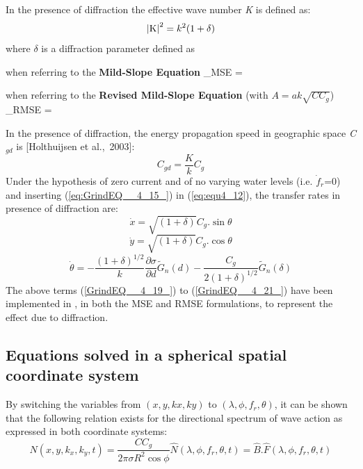  In the presence of diffraction the effective wave number \textit{K} is defined as:
\begin{equation} \label{eq:GrindEQ__4_15_}
\left|{\rm K} \right|^{2} =k^{2} (1+\delta )
\end{equation}
where $\delta$ is a diffraction parameter defined as

when referring to the \textbf{Mild-Slope Equation} \cite{Berkhoff1972}
\bequ
\label{eq:GrindEQ__4_16_}
 \delta _{MSE} = 
\eequ       
     
when referring to the \textbf{Revised Mild-Slope Equation} \cite{Porter2003} (with $A=ak\sqrt{CC_{g}}$)
\bequ
\label{eq:GrindEQ__4_17_}
\delta _{RMSE} = 
\eequ

 In the presence of diffraction, the energy propagation speed in geographic space \textit{C${}_{gd}$} is [Holthuijsen et al.,~2003]:
\begin{equation} \label{GrindEQ__4_18_}
C_{gd} =\frac{K}{k} C_{g}
\end{equation}
Under the hypothesis of zero current and of no varying water levels (i.e. $\dot{f}_{r} $=0) and inserting (\ref{eq:GrindEQ__4_15_}) in (\ref{eq:equ4_12}), the transfer rates in presence of diffraction are:
\begin{equation} \label{GrindEQ__4_19_}
\dot{x}=\sqrt{(1+\delta )} C_{g} .\sin \theta
\end{equation}
\begin{equation} \label{GrindEQ__4_20_}
\dot{y}=\sqrt{(1+\delta )} C_{g} .\cos \theta
\end{equation}
\begin{equation} \label{GrindEQ__4_21_}
\dot{\theta }=-\frac{(1+\delta )^{1/2} }{k} \frac{\partial \sigma }{\partial d} \tilde{G}_{n} (d)-\frac{C_{g} }{2(1+\delta )^{1/2} } \tilde{G}_{n} (\delta )
\end{equation}
The above terms (\ref{GrindEQ__4_19_}) to (\ref{GrindEQ__4_21_}) have been implemented in \tomawac, in both the MSE and RMSE formulations, to represent the effect due to diffraction.


\subsection{ Equations solved in a spherical spatial coordinate system}

 By switching the variables from $(x, y, kx, ky)$ to $(\lambda, \phi, f_r, \theta)$, it can be shown that the following relation exists for the directional spectrum of wave action as expressed in both coordinate systems:
\begin{equation} \label{GrindEQ__4_22_}
N(x,y,k_{x} ,k_{y} ,t)=\frac{CC_{g} }{2\pi \sigma R^{2} \cos \phi } \hat{N}(\lambda ,\phi ,f_{r} ,\theta ,t)=\hat{B}.\hat{F}(\lambda ,\phi ,f_{r} ,\theta ,t)
\end{equation}

